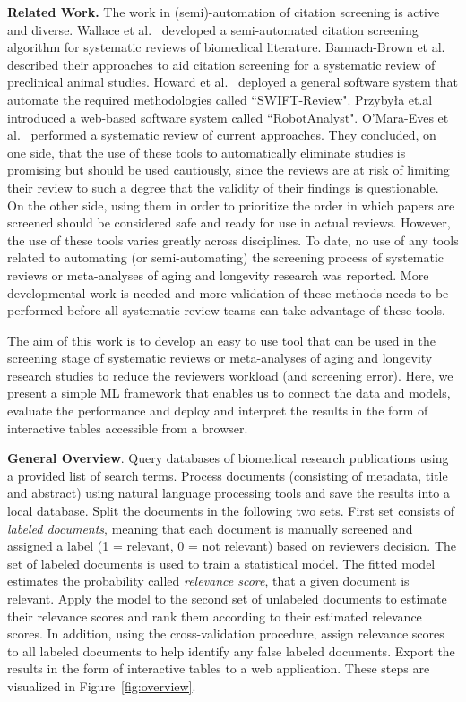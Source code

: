 \documentclass[10pt,twocolumn,letterpaper]{article}
\begin{document}
{\bf Related Work.} The work in (semi)-automation of citation screening is active and diverse. Wallace et al.~\cite{semi-automated} developed a semi-automated citation screening algorithm for systematic reviews of biomedical literature. Bannach-Brown et al.~\cite{animal-studies} described their approaches to aid citation screening for a systematic review of preclinical animal studies. Howard et al.~\cite{swift-workbench} deployed a general software system that automate the required methodologies called ``SWIFT-Review". Przybyła et.al~\cite{robot-analyst} introduced a web-based software system called ``RobotAnalyst". O’Mara-Eves et al.~\cite{mining-review} performed a systematic review of current approaches. They concluded, on one side, that the use of these tools to automatically eliminate studies is promising but should be used cautiously, since the reviews are at risk of limiting their review to such a degree that the validity of their findings is questionable. On the other side, using them in order to prioritize the order in which papers are screened should be considered safe and ready for use in actual reviews. However, the use of these tools varies greatly across disciplines. To date, no use of any tools related to automating (or semi-automating) the screening process of systematic reviews or meta-analyses of aging and longevity research was reported. More developmental work is needed and more validation of these methods needs to be performed before all systematic review teams can take advantage of these tools.
 
The aim of this work is to develop an easy to use tool that can be used in the screening stage of systematic reviews or meta-analyses of aging and longevity research studies to reduce the reviewers workload (and screening error). Here, we present a simple ML framework that enables us to connect the data and models, evaluate the performance and deploy and interpret the results in the form of interactive tables accessible from a browser.

{\bf General Overview}. Query databases of biomedical research publications using a provided list of search terms. Process documents (consisting of metadata, title and abstract) using natural language processing tools and save the results into a local database. Split the documents in the following two sets. First set consists of {\it labeled documents}, meaning that each document is manually screened and assigned a label (1 = relevant, 0 = not relevant) based on reviewers decision. The set of labeled documents is used to train a statistical model. The fitted model estimates the probability called {\it relevance score}, that a given document is relevant. Apply the model to the second set of unlabeled documents to estimate their relevance scores and rank them according to their estimated relevance scores. In addition, using the cross-validation procedure, assign relevance scores to all labeled documents to help identify any false labeled documents. Export the results in the form of interactive tables to a web application. These steps are visualized in Figure~\ref{fig:overview}.
\end{document}
